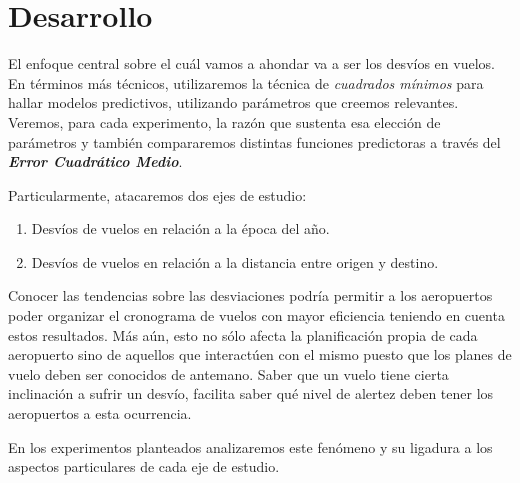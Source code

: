 \section{Desarrollo}

El enfoque central sobre el cu\'al vamos a ahondar va a ser los desv\'ios en vuelos. En t\'erminos m\'as t\'ecnicos, utilizaremos la t\'ecnica de \textit{cuadrados m\'inimos} para hallar modelos predictivos, utilizando par\'ametros que creemos relevantes. Veremos, para cada experimento, la raz\'on que sustenta esa elecci\'on de par\'ametros y tambi\'en compararemos distintas funciones predictoras a trav\'es del \textbf{\textit{Error Cuadr\'atico Medio}}.

Particularmente, atacaremos dos ejes de estudio:

\begin{enumerate}
\item Desv\'ios de vuelos en relaci\'on a la \'epoca del a\~no.
\item Desv\'ios de vuelos en relaci\'on a la distancia entre origen y destino.
\end{enumerate}

Conocer las tendencias sobre las desviaciones podr\'ia permitir a los aeropuertos poder organizar el cronograma de vuelos con mayor eficiencia teniendo en cuenta estos resultados. M\'as a\'un, esto no s\'olo afecta la planificaci\'on propia de cada aeropuerto sino de aquellos que interact\'uen con el mismo puesto que los planes de vuelo deben ser conocidos de antemano. Saber que un vuelo tiene cierta inclinaci\'on a sufrir un desv\'io, facilita saber qu\'e nivel de alertez deben tener los aeropuertos a esta ocurrencia.

En los experimentos planteados analizaremos este fen\'omeno y su ligadura a los aspectos particulares de cada eje de estudio.